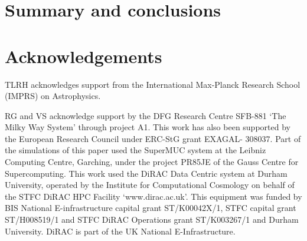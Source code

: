 \documentclass[a4paper,fleqn,usenatbib]{mnras}
\begin{document}
\section{Summary and conclusions}
\label{sec:conclusions}


\section*{Acknowledgements}
TLRH acknowledges support from the International Max-Planck Research School (IMPRS) on Astrophysics.

RG and VS acknowledge support by the DFG Research Centre SFB-881 `The
Milky Way System' through project A1. This work has also been
supported by the European Research Council under ERC-StG grant
EXAGAL- 308037. Part of the simulations of this paper used the
SuperMUC system at the Leibniz Computing Centre, Garching,
under the project PR85JE of the Gauss Centre for Supercomputing.
This work used the DiRAC Data Centric system at Durham
University, operated by the Institute for Computational Cosmology
on behalf of the STFC DiRAC HPC Facility `www.dirac.ac.uk'.
This equipment was funded by BIS National E-infrastructure capital 
grant ST/K00042X/1, STFC capital grant ST/H008519/1 and
STFC DiRAC Operations grant ST/K003267/1 and Durham University. 
DiRAC is part of the UK National E-Infrastructure.









\clearpage
\appendix
\end{document}
